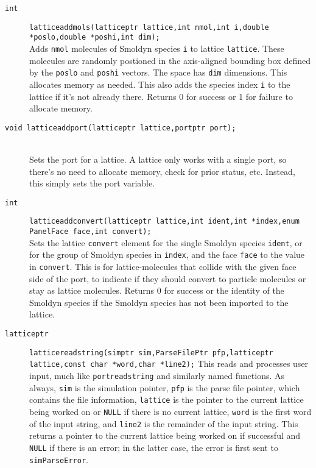 \documentclass {book}
\begin{document}
\begin{description}
\item[\texttt{int}]
\texttt{latticeaddmols(latticeptr lattice,int nmol,int i,double *poslo,double *poshi,int dim);}
\hfill \\
Adds \texttt{nmol} molecules of Smoldyn species \texttt{i} to lattice \texttt{lattice}. These molecules are randomly postioned in the axis-aligned bounding box defined by the \texttt{poslo} and \texttt{poshi} vectors. The space has \texttt{dim} dimensions. This allocates memory as needed. This also adds the species index \texttt{i} to the lattice if it's not already there. Returns 0 for success or 1 for failure to allocate memory.

\item[\texttt{void latticeaddport(latticeptr lattice,portptr port);}]
\hfill \\
Sets the port for a lattice. A lattice only works with a single port, so there's no need to allocate memory, check for prior status, etc. Instead, this simply sets the port variable.

\item[\texttt{int}]
\texttt{latticeaddconvert(latticeptr lattice,int ident,int *index,enum PanelFace face,int convert);}
\hfill \\
Sets the lattice \texttt{convert} element for the single Smoldyn species \texttt{ident}, or for the group of Smoldyn species in \texttt{index}, and the face \texttt{face} to the value in \texttt{convert}. This is for lattice-molecules that collide with the given face side of the port, to indicate if they should convert to particle molecules or stay as lattice molecules. Returns 0 for success or the identity of the Smoldyn species if the Smoldyn species has not been imported to the lattice.

\item[\texttt{latticeptr}]
\texttt{latticereadstring(simptr sim,ParseFilePtr pfp,latticeptr lattice,const char *word,char *line2);}
This reads and processes user input, much like \texttt{portreadstring} and similarly named functions. As always, \texttt{sim} is the simulation pointer, \texttt{pfp} is the parse file pointer, which contains the file information, \texttt{lattice} is the pointer to the current lattice being worked on or \texttt{NULL} if there is no current lattice, \texttt{word} is the first word of the input string, and \texttt{line2} is the remainder of the input string. This returns a pointer to the current lattice being worked on if successful and \texttt{NULL} if there is an error; in the latter case, the error is first sent to \texttt{simParseError}. 


\end{description}
\end{document}
